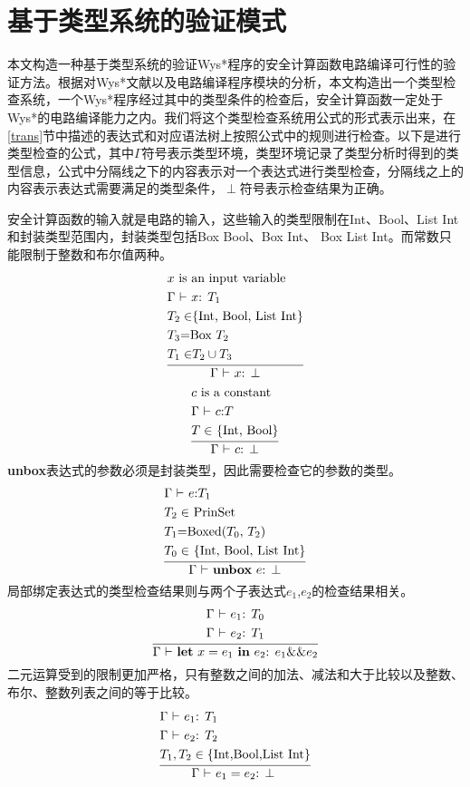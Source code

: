 \section{基于类型系统的验证模式}
本文构造一种基于类型系统的验证Wys*程序的安全计算函数电路编译可行性的验证方法。根据对Wys*文献以及电路编译程序模块的分析，本文构造出一个类型检查系统，一个Wys*程序经过其中的类型条件的检查后，安全计算函数一定处于Wys*的电路编译能力之内。我们将这个类型检查系统用公式的形式表示出来，在\ref{trans}节中描述的表达式和对应语法树上按照公式中的规则进行检查。以下是进行类型检查的公式，其中$\Gamma$符号表示类型环境，类型环境记录了类型分析时得到的类型信息，公式中分隔线之下的内容表示对一个表达式进行类型检查，分隔线之上的内容表示表达式需要满足的类型条件，$\perp$符号表示检查结果为正确。

安全计算函数的输入就是电路的输入，这些输入的类型限制在Int、Bool、List Int和封装类型范围内，封装类型包括Box Bool、Box Int、 Box List Int。而常数只能限制于整数和布尔值两种。
\[
\infertext {
&\textrm{$x$ is an input variable}\\
&\textrm{$\Gamma$ $\vdash$ $x$: $T_1$}\\
&\textrm{$T_2\in$\{Int, Bool, List Int\}}\\
&\textrm{$T_3$=Box $T_2$}\\
&\textrm{$T_1\in$$T_2\cup T_3$}
}{$\Gamma$ $\vdash$ $x$: $\perp$}
\]
\[
\infertext {
&\textrm{$c$ is a constant}\\
&\textrm{$\Gamma$ $\vdash$ $c$:$T$}\\
&\textrm{$T\in$ \{Int, Bool\}}
}{$\Gamma$ $\vdash$ $c$: $\perp$}
\]
\textbf{unbox}表达式的参数必须是封装类型，因此需要检查它的参数的类型。
\[
\infertext {
&\textrm{$\Gamma$ $\vdash$ $e$:$T_1$}\\
&\textrm{$T_2\in$ PrinSet}\\
&\textrm{$T_1$=Boxed($T_0$, $T_2$)}\\
&\textrm{$T_0\in$ \{Int, Bool, List Int\}}
}{$\Gamma$ $\vdash$ \textbf{unbox} $e$: $\perp$}
\]
局部绑定表达式的类型检查结果则与两个子表达式$e_1$,$e_2$的检查结果相关。
\[
\infertext {
&\textrm{$\Gamma$ $\vdash$ $e_1$: $T_0$}\\
&\textrm{$\Gamma$ $\vdash$ $e_2$: $T_1$}
}{$\Gamma$ $\vdash$ \textbf{let} $x = e_1$ \textbf{in} $e_2$: $e_1$\&\&$e_2$}
\]
二元运算受到的限制更加严格，只有整数之间的加法、减法和大于比较以及整数、布尔、整数列表之间的等于比较。
\[
\infertext {
&\textrm{$\Gamma$ $\vdash$ $e_1$: $T_1$}\\
&\textrm{$\Gamma$ $\vdash$ $e_2$: $T_2$}\\
&\textrm{$T_1,T_2 \in \{\text{Int,Bool,List Int}\}$}
}{$\Gamma$ $\vdash$ $e_1 = e_2$: $\perp$ }
\]
